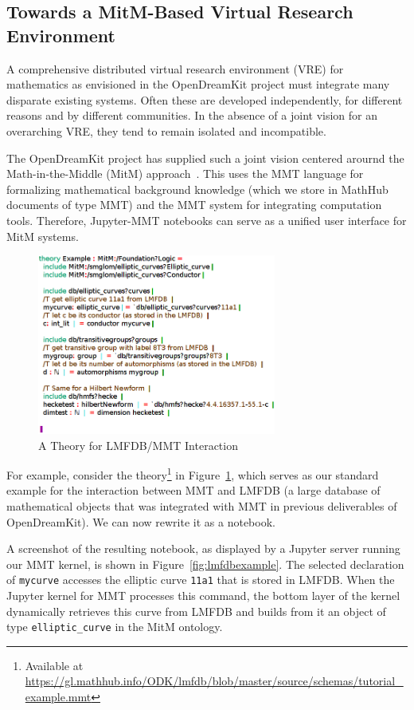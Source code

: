 \subsection{Towards a MitM-Based Virtual Research Environment}


A comprehensive distributed virtual research environment (VRE) for mathematics as envisioned in the OpenDreamKit project must integrate many disparate existing systems.
Often these are developed independently, for different reasons and by different communities.
In the absence of a joint vision for an overarching VRE, they tend to remain isolated and incompatible.

The OpenDreamKit project has supplied such a joint vision centered arournd the Math-in-the-Middle (MitM) approach~\cite{DehKohKon:iop16}.
This uses the MMT language for formalizing mathematical background knowledge (which we store in MathHub documents of type MMT) and the MMT system for integrating computation tools.
Therefore, Jupyter-MMT notebooks can serve as a unified user interface for MitM systems.

\begin{figure}[ht]\centering
  \includegraphics[width=0.7\textwidth]{../D4.11/hecke}
  \caption{A Theory for LMFDB/MMT Interaction}\label{fig:hecke}
\end{figure}

For example, consider the theory\footnote{Available at \url{https://gl.mathhub.info/ODK/lmfdb/blob/master/source/schemas/tutorial_example.mmt}}  in Figure~\ref{fig:hecke}, which serves as our standard example for the interaction between MMT and LMFDB (a large database of mathematical objects that was integrated with MMT in previous deliverables of OpenDreamKit).
We can now rewrite it as a notebook.

A screenshot of the resulting notebook, as displayed by a Jupyter server running our MMT kernel, is shown in Figure~\ref{fig:lmfdbexample}.
The selected declaration of \texttt{mycurve} accesses the elliptic curve \texttt{11a1} that is stored in LMFDB.
When the Jupyter kernel for MMT processes this command, the bottom layer of the kernel dynamically retrieves this curve from LMFDB and builds from it an object of type \texttt{elliptic\_curve} in the MitM ontology.

